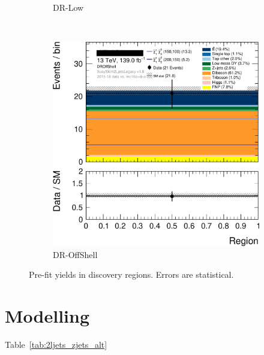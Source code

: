 \begin{figure}[tp]
\begin{subfigure}{0.38\textwidth}
\caption{DR-Low}
\end{subfigure}
\\[0.5em]
\begin{subfigure}{0.38\textwidth}
\centering
\includegraphics[width=\textwidth]{figures/2ljets_disco_plot_DROffShell.png}
\caption{DR-OffShell}
\end{subfigure}
\caption[
Pre-fit yields in discovery regions
]{%
Pre-fit yields in discovery regions.
Errors are statistical.
}
\label{fig:2ljets_disco_prefit}
\end{figure}


\section{Modelling}


Table~\ref{tab:2ljets_zjets_alt}

